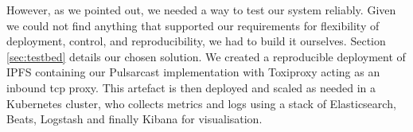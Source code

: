However, as we pointed out, we needed a way to test our system reliably. Given
we could not find anything that supported our requirements for flexibility of
deployment, control, and reproducibility, we had to build it ourselves. Section
\ref{sec:testbed} details our chosen solution. We created a reproducible
deployment of IPFS containing our Pulsarcast implementation with Toxiproxy
acting as an inbound \acrshort{tcp} proxy. This artefact is then deployed and
scaled as needed in a Kubernetes cluster, who collects metrics and logs using a
stack of Elasticsearch, Beats, Logstash and finally Kibana for visualisation.
